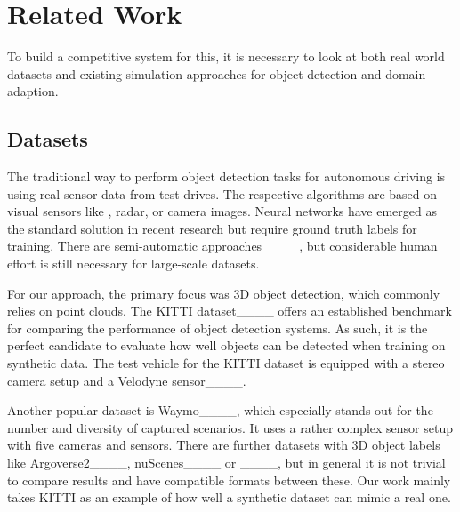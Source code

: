 \section{Related Work}
To build a competitive system for this, it is necessary to look at both real world datasets and existing simulation approaches for object detection and domain adaption.
\subsection{Datasets}
The traditional way to perform object detection tasks for autonomous driving is using real sensor data from test drives. The respective algorithms are based on visual sensors like \li, radar, or camera images. Neural networks have emerged as the standard solution in recent research but require ground truth labels for training. 
There are semi-automatic approaches____, but considerable human effort is still necessary for large-scale datasets.  

For our approach, the primary focus was 3D object detection, which commonly relies on \li point clouds. 
The KITTI dataset____ offers an established benchmark for comparing the performance of object detection systems.
As such, it is the perfect candidate to evaluate how well objects can be detected when training on synthetic data.
The test vehicle for the KITTI dataset is equipped with a stereo camera setup and a Velodyne \li sensor____. %

Another popular dataset is Waymo____, which especially stands out for the number and diversity of captured scenarios. It uses a rather complex sensor setup with five cameras and \li sensors. 
There are further datasets with 3D object labels like Argoverse2____, nuScenes____ or ____, but in general it is not trivial to compare results and have compatible formats between these. 
Our work mainly takes KITTI as an example of how well a synthetic dataset can mimic a real one.%


